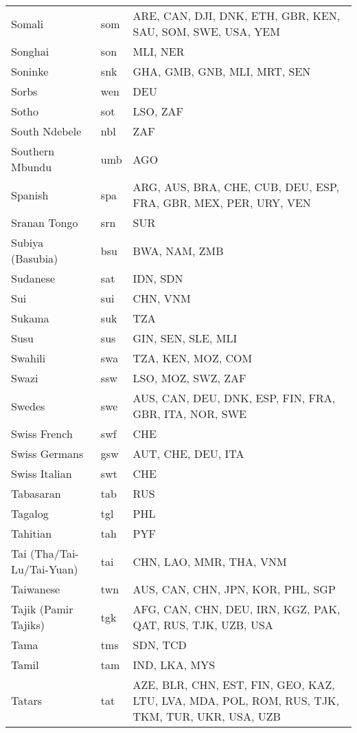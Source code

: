 \documentclass[12pt]{article}
\begin{document}
\begin{center}
\begin{longtable}{|p{7cm}|p{1cm}|p{7cm}|}
Somali	&	som 	&	ARE, CAN, DJI, DNK, ETH, GBR, KEN, SAU, SOM, SWE, USA, YEM 	\\	\cline{1-3}
Songhai	&	son 	&	MLI, NER	\\	\cline{1-3}
Soninke	&	snk 	&	GHA, GMB, GNB, MLI, MRT, SEN 	\\	\cline{1-3}
Sorbs	&	wen 	&	DEU	\\	\cline{1-3}
Sotho	&	sot 	&	LSO, ZAF	\\	\cline{1-3}
South Ndebele	&	nbl 	&	ZAF	\\	\cline{1-3}
Southern Mbundu	&	umb 	&	AGO	\\	\cline{1-3}
Spanish	&	spa 	&	ARG, AUS, BRA, CHE, CUB, DEU, ESP, FRA, GBR, MEX, PER, URY, VEN	\\	\cline{1-3}
Sranan Tongo	&	srn 	&	SUR	\\	\cline{1-3}
Subiya (Basubia)	&	bsu	&	BWA, NAM, ZMB	\\	\cline{1-3}
Sudanese	&	sat	&	IDN, SDN	\\	\cline{1-3}
Sui	&	sui	&	CHN, VNM	\\	\cline{1-3}
Sukama	&	suk 	&	TZA	\\	\cline{1-3}
Susu	&	sus 	&	GIN, SEN, SLE, MLI	\\	\cline{1-3}
Swahili	&	swa 	&	TZA, KEN, MOZ, COM	\\	\cline{1-3}
Swazi	&	ssw 	&	LSO, MOZ, SWZ, ZAF	\\	\cline{1-3}
Swedes	&	swe 	&	AUS, CAN, DEU, DNK, ESP, FIN, FRA, GBR, ITA, NOR, SWE	\\	\cline{1-3}
Swiss French	&	swf	&	CHE	\\	\cline{1-3}
Swiss Germans	&	gsw 	&	AUT, CHE, DEU, ITA	\\	\cline{1-3}
Swiss Italian	&	swt	&	CHE	\\	\cline{1-3}
Tabasaran	&	tab	&	RUS	\\	\cline{1-3}
Tagalog	&	tgl 	&	PHL	\\	\cline{1-3}
Tahitian	&	tah 	&	PYF	\\	\cline{1-3}
Tai (Tha/Tai-Lu/Tai-Yuan)	&	tai 	&	CHN, LAO, MMR, THA, VNM	\\	\cline{1-3}
Taiwanese	&	twn	&	AUS, CAN, CHN, JPN, KOR, PHL, SGP	\\	\cline{1-3}
Tajik (Pamir Tajiks)	&	tgk 	&	AFG, CAN, CHN, DEU, IRN, KGZ, PAK, QAT, RUS, TJK, UZB, USA	\\	\cline{1-3}
Tama	&	tms	&	SDN, TCD	\\	\cline{1-3}
Tamil	&	tam 	&	IND, LKA, MYS	\\	\cline{1-3}
Tatars	&	tat 	&	AZE, BLR, CHN, EST, FIN, GEO, KAZ, LTU, LVA, MDA, POL, ROM, RUS, TJK, TKM, TUR, UKR, USA, UZB	 \\	\cline{1-3}

\end{longtable}
\end{center}
\end{document}
